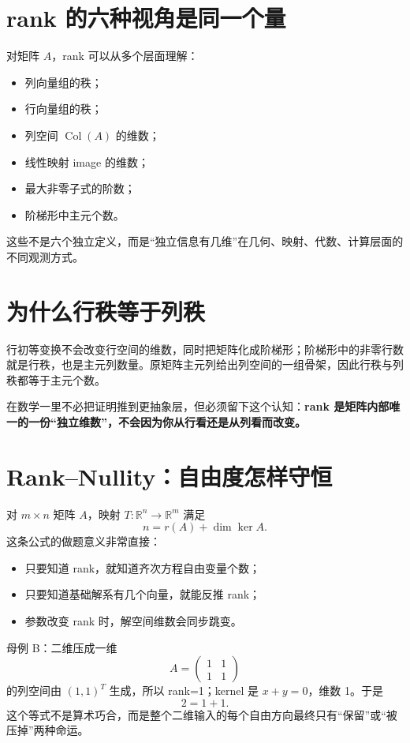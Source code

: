 \documentclass[11pt,a4paper,openany]{ctexbook}
\newcommand{\key}[1]{\textbf{\color{deep}#1}}
\begin{document}
\section{rank 的六种视角是同一个量}
对矩阵 $A$，rank 可以从多个层面理解：
\begin{itemize}
  \item 列向量组的秩；
  \item 行向量组的秩；
  \item 列空间 $\operatorname{Col}(A)$ 的维数；
  \item 线性映射 image 的维数；
  \item 最大非零子式的阶数；
  \item 阶梯形中主元个数。
\end{itemize}
这些不是六个独立定义，而是“独立信息有几维”在几何、映射、代数、计算层面的不同观测方式。

\section{为什么行秩等于列秩}
行初等变换不会改变行空间的维数，同时把矩阵化成阶梯形；阶梯形中的非零行数就是行秩，也是主元列数量。原矩阵主元列给出列空间的一组骨架，因此行秩与列秩都等于主元个数。

在数学一里不必把证明推到更抽象层，但必须留下这个认知：\key{rank 是矩阵内部唯一的一份“独立维数”，不会因为你从行看还是从列看而改变。}

\section{Rank--Nullity：自由度怎样守恒}
对 $m\times n$ 矩阵 $A$，映射 $T:\mathbb R^n\to\mathbb R^m$ 满足
\[
\boxed{n=r(A)+\dim\ker A}.
\]
这条公式的做题意义非常直接：
\begin{itemize}
  \item 只要知道 rank，就知道齐次方程自由变量个数；
  \item 只要知道基础解系有几个向量，就能反推 rank；
  \item 参数改变 rank 时，解空间维数会同步跳变。
\end{itemize}

\begin{examplebox}{母例 B：二维压成一维}
\[
A=\begin{pmatrix}1&1\\1&1\end{pmatrix}
\]
的列空间由 $(1,1)^T$ 生成，所以 rank=1；kernel 是 $x+y=0$，维数 1。于是
\[
2=1+1.
\]
这个等式不是算术巧合，而是整个二维输入的每个自由方向最终只有“保留”或“被压掉”两种命运。
\end{examplebox}
\end{document}
